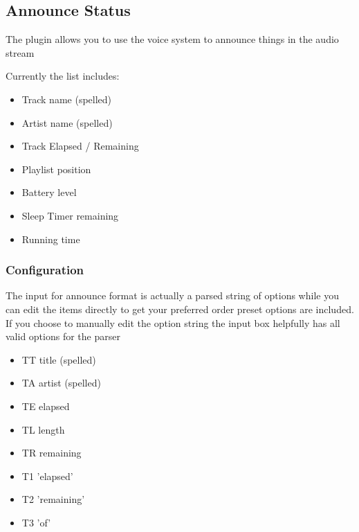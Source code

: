 \subsection{Announce Status}

The  plugin allows you to use the voice system to announce things in the audio stream

Currently the list includes:
\begin{itemize}
\item Track name (spelled)
\item Artist name (spelled)
\item Track Elapsed / Remaining
\item Playlist position
\item Battery level
\item Sleep Timer remaining
\item Running time
\end{itemize}

\subsubsection{Configuration}
The input for announce format is actually a parsed string of options
while you can edit the items directly to get your preferred order preset options are included.
If you choose to manually edit the option string the input box helpfully has all valid options for the parser


\begin{itemize}
\item TT title (spelled)
\item TA artist (spelled)
\item TE elapsed
\item TL length
\item TR remaining
\item T1 'elapsed'
\item T2 'remaining'
\item T3 'of'
\end{itemize}

